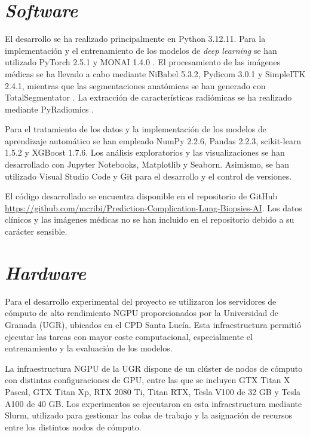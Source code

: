 \section{\textit{Software}}

El desarrollo se ha realizado principalmente en Python 3.12.11. Para la implementación y el entrenamiento de los modelos de \textit{deep learning} se han utilizado PyTorch 2.5.1 y MONAI 1.4.0 \cite{cardoso2022monai}. El procesamiento de las imágenes médicas se ha llevado a cabo mediante NiBabel 5.3.2, Pydicom 3.0.1 y SimpleITK 2.4.1, mientras que las segmentaciones anatómicas se han generado con TotalSegmentator \cite{wasserthal2023totalsegmentator}. La extracción de características radiómicas se ha realizado mediante PyRadiomics \cite{VanGriethuysen2017}.

Para el tratamiento de los datos y la implementación de los modelos de aprendizaje automático se han empleado NumPy 2.2.6, Pandas 2.2.3, scikit-learn 1.5.2 y XGBoost 1.7.6. Los análisis exploratorios y las visualizaciones se han desarrollado con Jupyter Notebooks, Matplotlib y Seaborn. Asimismo, se han utilizado Visual Studio Code y Git para el desarrollo y el control de versiones.

El código desarrollado se encuentra disponible en el repositorio de GitHub \url{https://github.com/mcribi/Prediction-Complication-Lung-Biopsies-AI}. Los datos clínicos y las imágenes médicas no se han incluido en el repositorio debido a su carácter sensible.


\section{\textit{Hardware}}

Para el desarrollo experimental del proyecto se utilizaron los servidores de cómputo de alto rendimiento NGPU proporcionados por la Universidad de Granada (UGR), ubicados en el CPD Santa Lucía. Esta infraestructura permitió ejecutar las tareas con mayor coste computacional, especialmente el entrenamiento y la evaluación de los modelos.

La infraestructura NGPU de la UGR dispone de un clúster de nodos de cómputo con distintas configuraciones de GPU, entre las que se incluyen GTX Titan X Pascal, GTX Titan Xp, RTX 2080 Ti, Titan RTX, Tesla V100 de 32 GB y Tesla A100 de 40 GB. Los experimentos se ejecutaron en esta infraestructura mediante Slurm, utilizado para gestionar las colas de trabajo y la asignación de recursos entre los distintos nodos de cómputo.


